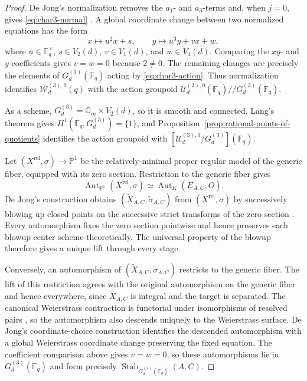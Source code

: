 \documentclass[a4paper,12pt]{amsart}
\theoremstyle{definition}
\newcommand{\cU}{\mathcal{U}}
\newcommand{\cW}{\mathcal{W}}
\newcommand{\Fb}{\mathbb{F}}
\newcommand{\Pb}{\mathbb{P}}
\newcommand{\Gb}{\mathbb{G}}
\newcommand{\Aut}{\operatorname{Aut}}
\begin{document}
\begin{proof}
De Jong's normalization removes the $a_1$- and $a_3$-terms and, when $j=0$, gives \eqref{eq:char3-normal} \cite[Section~4.13(b2)]{dJ2}.  A global coordinate change between two normalized equations has the form
\[
x\longmapsto u^2x+s,
\qquad
y\longmapsto u^3y+vx+w,
\]
where $u\in\Fb_q^\times$, $s\in V_2(d)$, $v\in V_1(d)$, and $w\in V_3(d)$.  Comparing the $xy$- and $y$-coefficients gives $v=w=0$ because $2\neq0$.  The remaining changes are precisely the elements of $G_d^{(3)}(\Fb_q)$ acting by \eqref{eq:char3-action}.  Thus normalization identifies $\cW_d^{(3),0}(q)$ with the action groupoid $\cU_d^{(3),0}(\Fb_q)\mathbin{//}G_d^{(3)}(\Fb_q)$.

As a scheme, $G_d^{(3)}=\Gb_m\times V_2(d)$, so it is smooth and connected.  Lang's theorem gives $H^1(\Fb_q,G_d^{(3)})=\{1\}$, and Proposition~\ref{prop:rational-points-of-quotients} identifies the action groupoid with $[\cU_d^{(3),0}/G_d^{(3)}](\Fb_q)$.

Let $(X^{\mathrm{rel}},\sigma)\to\Pb^1$ be the relatively-minimal proper regular model of the generic fiber, equipped with its zero section. Restriction to the generic fiber gives
\[
\Aut_{\Pb^1}(X^{\mathrm{rel}},\sigma)
\simeq
\Aut_K(E_{A,C},O).
\]
De Jong's construction obtains $(\widetilde X_{A,C},\widetilde\sigma_{A,C})$ from $(X^{\mathrm{rel}},\sigma)$ by successively blowing up closed points on the successive strict transforms of the zero section \cite[Section~4.11]{dJ2}.  Every automorphism fixes the zero section pointwise and hence preserves each blowup center scheme-theoretically. The universal property of the blowup therefore gives a unique lift through every stage.

Conversely, an automorphism of $(\widetilde X_{A,C},\widetilde\sigma_{A,C})$ restricts to the generic fiber.  The lift of this restriction agrees with the original automorphism on the generic fiber and hence everywhere, since $\widetilde X_{A,C}$ is integral and the target is separated.  The canonical Weierstrass contraction is functorial under isomorphisms of resolved pairs \cite[Sections~4.5--4.8]{dJ2}, so the automorphism also descends uniquely to the Weierstrass surface.  De Jong's coordinate-choice construction identifies the descended automorphism with a global Weierstrass coordinate change preserving the fixed equation.  The coefficient comparison above gives $v=w=0$, so these automorphisms lie in $G_d^{(3)}(\Fb_q)$ and form precisely $\operatorname{Stab}_{G_d^{(3)}(\Fb_q)}(A,C)$.
\end{proof}
\end{document}
